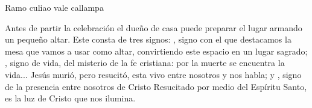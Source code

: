 Ramo culiao vale callampa

Antes de partir la celebración el dueño de casa puede preparar el lugar armando un pequeño altar. Este consta de tres signos: , signo con el que destacamos la mesa que vamos a usar como altar, convirtiendo este espacio en un lugar sagrado; , signo de vida, del misterio de la fe cristiana: por la muerte se encuentra la vida... Jesús murió, pero resucitó, esta vivo entre nosotros y nos habla; y , signo de la presencia entre nosotros de Cristo Resucitado por medio del Espíritu Santo, es la luz de Cristo que nos ilumina.